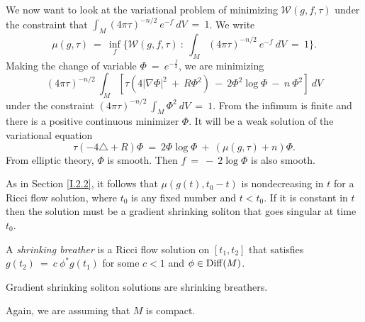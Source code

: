 We now want to look at the variational problem of
minimizing ${\mathcal W}(g,f,\tau)$ under the constraint
that $\int_M (4 \pi \tau)^{-n/2} \: e^{-f} \: dV \: = \: 1$.
We write
\begin{equation}
\mu(g, \tau) \: = \: \inf_f \{ {\mathcal W}(g,f,\tau) \: : \:
\int_M (4 \pi \tau)^{-n/2} \: e^{-f} \: dV \: = \: 1\}.
\end{equation}
Making the change of variable $\Phi \: = \: e^{- \frac{f}{2}}$, we are
minimizing
\begin{equation}
(4 \pi \tau)^{-n/2} \: \int_M \left[ \tau (4 |\nabla \Phi|^2 \: + \: R \Phi^2) \: - \:
2 \Phi^2 \log \Phi \: - \: n \: \Phi^2 \right] \: dV
\end{equation}
under the constraint $(4 \pi \tau)^{-n/2} \: \int_M \Phi^2 \: dV \: = \: 1$.
From  \cite[Section 1]{Rothaus (1981)} the infimum is finite and
there is a positive
continuous minimizer $\Phi$. It will be a weak solution of the
variational equation
\begin{equation}
\tau (- 4 \triangle + R) \Phi \: = \: 2\Phi \log \Phi \: + \:
(\mu(g, \tau) + n) \Phi.
\end{equation}
From elliptic theory, $\Phi$ is smooth. Then $f \: = \: - \: 2 \log \Phi$
is also smooth.

As in Section \ref{I.2.2}, it follows that
$\mu(g(t), t_0 - t)$ is nondecreasing in $t$ for a Ricci flow
solution, where $t_0$ is any fixed number and $t < t_0$.
If it is constant in $t$ then the solution must be
a gradient shrinking soliton that goes singular at time $t_0$.

\begin{definition}
  \label{def:kl-w-entropy-shrinking-breather-definition}

A {\em shrinking breather} is a Ricci flow solution on $[t_1, t_2]$ that
satisfies $g(t_2) \: = \: c \: \phi^* g(t_1)$ for some
$c < 1$ and $\phi \in \operatorname{Diff}(M)$.
\end{definition}

Gradient shrinking soliton solutions
are shrinking breathers.

Again, we are assuming that $M$ is
compact.

